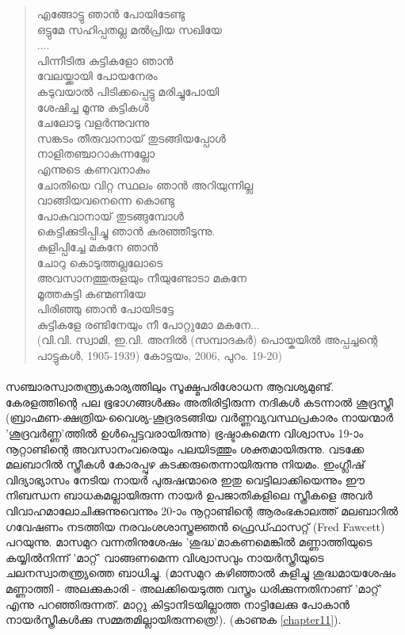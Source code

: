 \begin{tcolorbox}[%
 breakable, %
  arc=0mm, 
  left=1pt, right = 1pt, 
  boxrule=0mm,
  colback = {blue!10}, %
]
\begin{quote}
എങ്ങോട്ടു ഞാൻ പോയിടേണ്ടു\\
ഒട്ടുമേ സഹിപ്പതല്ല മൽപ്രിയ സഖിയേ\\
....\\
പിന്നീടിരു കുട്ടികളോ ഞാൻ\\
വേലയ്ക്കായി പോയനേരം\\
കടുവയാൽ പിടിക്കപ്പെട്ടു മരിച്ചുപോയി\\
ശേഷിച്ച മൂന്നു കുട്ടികൾ\\
ചേലോടു വളർന്നുവന്നു\\
സങ്കടം തീരുവാനായ് തുടങ്ങിയപ്പോൾ\\
നാളിതഞ്ചാറാകുന്നല്ലോ\\
എന്നുടെ കണവനാകും\\
ചോതിയെ വിറ്റ സ്ഥലം ഞാൻ അറിയുന്നില്ല\\
വാങ്ങിയവനെന്നെ കൊണ്ടു\\
പോകുവാനായ് തുടങ്ങുമ്പോൾ\\
കെട്ടിക്കുടിപ്പിച്ചു ഞാൻ കരഞ്ഞീടുന്നു.\\
കുളിപ്പിച്ചേ മകനേ ഞാൻ\\
ചോറു കൊടുത്തല്ലലോടെ\\
അവസാനത്തുരുളയും നീയുണ്ടോടാ മകനേ\\
മൂത്തകുട്ടി കണ്മണിയേ\\
പിരിഞ്ഞു ഞാൻ പോയിടട്ടേ\\
കുട്ടികളേ രണ്ടിനേയും നീ പോറ്റുമോ മകനേ...\\
(വി.വി. സ്വാമി, ഇ.വി. അനിൽ (സമ്പാദകർ) പൊയ്കയിൽ അപ്പച്ചന്റെ പാട്ടുകൾ, 1905-1939) കോട്ടയം, 2006, പുറം. 19-20)
\end{quote}
\end{tcolorbox}

\paragraph{}സഞ്ചാരസ്വാതന്ത്ര്യകാര്യത്തിലും സൂക്ഷ്മപരിശോധന ആവശ്യമുണ്ട്. കേരളത്തിന്റെ പല ഭൂഭാഗങ്ങൾക്കും അതിരിട്ടിരുന്ന നദികൾ കടന്നാൽ ശൂദ്രസ്ത്രീ (ബ്രാഹ്മണ-ക്ഷത്രിയ-വൈശ്യ-ശൂദ്രരടങ്ങിയ വർണ്ണവ്യവസ്ഥപ്രകാരം നായന്മാർ 'ശൂദ്രവർണ്ണ'ത്തിൽ ഉൾപ്പെട്ടവരായിരുന്നു) ഭ്രഷ്ടാകുമെന്ന വിശ്വാസം 19-ാം നൂറ്റാണ്ടിന്റെ അവസാനംവരെയും പലയിടത്തും ശക്തമായിരുന്നു. വടക്കേ മലബാറിൽ സ്ത്രീകൾ കോരപ്പുഴ കടക്കരുതെന്നായിരുന്നു നിയമം. ഇംഗ്ലീഷ് വിദ്യാഭ്യാസം നേടിയ നായർ പുരുഷന്മാരെ ഇതു വെട്ടിലാക്കിയെന്നും ഈ നിബന്ധന ബാധകമല്ലായിരുന്ന നായർ ഉപജാതികളിലെ സ്ത്രീകളെ അവർ വിവാഹമാലോചിക്കുന്നുവെന്നും 20-ാം നൂറ്റാണ്ടിന്റെ ആരംഭകാലത്ത് മലബാറിൽ ഗവേഷണം നടത്തിയ നരവംശശാസ്ത്രജ്ഞൻ ഫ്രെഡ്ഫാസറ്റ് (Fred Fawcett) പറയുന്നു. മാസമുറ വന്നതിനുശേഷം 'ശുദ്ധ'മാകണമെങ്കിൽ മണ്ണാത്തിയുടെ കയ്യിൽനിന്ന് 'മാറ്റ്' വാങ്ങണമെന്ന വിശ്വാസവും നായർസ്ത്രീയുടെ ചലനസ്വാതന്ത്ര്യത്തെ ബാധിച്ചു. (മാസമുറ കഴിഞ്ഞാൽ കുളിച്ചു ശുദ്ധമായശേഷം മണ്ണാത്തി - അലക്കുകാരി - അലക്കിയെടുത്ത വസ്ത്രം ധരിക്കുന്നതിനാണ് 'മാറ്റ്' എന്നു പറഞ്ഞിരുന്നത്. മാറ്റു കിട്ടാനിടയില്ലാത്ത നാട്ടിലേക്കു പോകാൻ നായർസ്ത്രീകൾക്കു സമ്മതമില്ലായിരുന്നത്രെ!). (കാണുക \ref{chapter11}).

